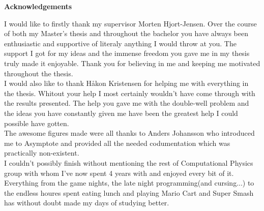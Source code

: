 \thispagestyle{empty}
\clearpage

\begin{center}
    \textbf{\Large{Acknowledgements}}\\ \vspace{0.6cm}
\end{center}
    I would like to firstly thank my supervisor Morten Hjort-Jensen. Over the
    course of both my Master's thesis and throughout the bachelor you have
    always been enthusiastic and supportive of literaly anything I would throw
    at you. The support I got for my ideas and the immense freedom you gave me
    in my thesis truly made it enjoyable. Thank you for believing in me and
    keeping me motivated throughout the thesis. \\
    I would also like to thank Håkon Kristensen for helping me with everything
    in the thesis. Whitout your help I most certainly wouldn't have come
    through with the results presented. The help you gave me with the
    double-well problem and the ideas you have constantly given me have been
    the greatest help I could possible have gotten. \\
    The awesome figures made were all thanks to Anders Johansson who introduced
    me to Asymptote and provided all the needed codumentation which was
    practically non-existent. \\
    I couldn't possibly finish without mentioning the rest of Computational
    Physics group with whom I've now spent 4 years with and enjoyed every bit
    of it. Everything from the game nights, the late night programming(and
    cursing...) to the endless houres spent eating lunch and playing Mario
    Cart and Super Smash has without doubt made my days of studying better.
\thispagestyle{empty}
\clearpage

{%
    \tableofcontents
    \thispagestyle{empty}
    \clearpage}%

\thispagestyle{empty}
\clearpage

